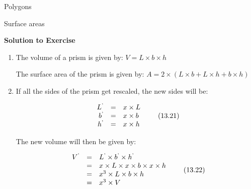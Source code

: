 \begin{exercises}{Polygons}
\begin{exercises}{Surface areas }
{\begin{mdframed}[linewidth=4, leftmargin=40, rightmargin=40]
\begin{exercise}
        
        \vspace{5pt}
        \label{m39357*solfhsst!!!underscore!!!id166}\noindent\textbf{Solution to Exercise } \label{m39357*listfhsst!!!underscore!!!id166}\begin{enumerate}[noitemsep, label=\textbf{Step} \textbf{\arabic*}. ] 
            \leftskip=20pt\rightskip=\leftskip\item  
        \label{m39357*id63750}The volume of a prism is given by:
$V=L\ensuremath{\times}b\ensuremath{\times}h$\par 
        \label{m39357*id63774}The surface area of the prism is given by:
$A=2\ensuremath{\times}\left(L\ensuremath{\times}b+L\ensuremath{\times}h+b\ensuremath{\times}h\right)$\par 
        \item  
        \label{m39357*id63826}If all the sides of the prism get rescaled, the new sides will be:\par 
        \label{m39357*id63830}\nopagebreak\noindent{}
          
    \begin{equation}
    \begin{array}{ccc}\hfill {L}^{\text{'}}& =& x\ensuremath{\times}L\hfill \\ \hfill {b}^{\text{'}}& =& x\ensuremath{\times}b\hfill \\ \hfill {h}^{\text{'}}& =& x\ensuremath{\times}h\hfill \end{array}\tag{13.21}
      \end{equation}
    
        
        \label{m39357*id63916}The new volume will then be given by:\par 
        \label{m39357*id63920}\nopagebreak\noindent{}
          
    \begin{equation}
    \begin{array}{ccc}\hfill {V}^{\text{'}}& =& {L}^{\text{'}}\ensuremath{\times}{b}^{\text{'}}\ensuremath{\times}{h}^{\text{'}}\hfill \\ & =& x\ensuremath{\times}L\ensuremath{\times}x\ensuremath{\times}b\ensuremath{\times}x\ensuremath{\times}h\hfill \\ & =& {x}^{3}\ensuremath{\times}L\ensuremath{\times}b\ensuremath{\times}h\hfill \\ & =& {x}^{3}\ensuremath{\times}V\hfill \end{array}\tag{13.22}
      \end{equation}
    

\end{enumerate}
\end{exercise}
\end{mdframed}}
\end{exercises}
\end{exercises}
